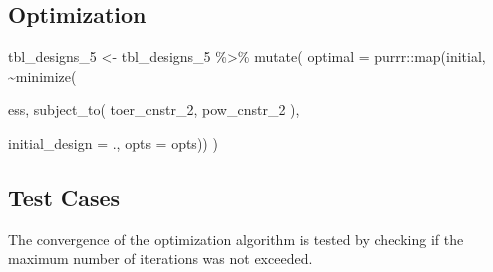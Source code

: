 \documentclass[
]{book}
\newenvironment{Shaded}{\begin{snugshade}}{\end{snugshade}}
\newcommand{\AttributeTok}[1]{\textcolor[rgb]{0.77,0.63,0.00}{#1}}
\newcommand{\FunctionTok}[1]{\textcolor[rgb]{0.00,0.00,0.00}{#1}}
\newcommand{\NormalTok}[1]{#1}
\newcommand{\OtherTok}[1]{\textcolor[rgb]{0.56,0.35,0.01}{#1}}
\newcommand{\SpecialCharTok}[1]{\textcolor[rgb]{0.00,0.00,0.00}{#1}}
\begin{document}
\hypertarget{optimization-8}{%
\subsection{Optimization}\label{optimization-8}}

\begin{Shaded}
\begin{Highlighting}[]
\NormalTok{tbl\_designs\_5 }\OtherTok{\textless{}{-}}\NormalTok{ tbl\_designs\_5 }\SpecialCharTok{\%\textgreater{}\%} 
    \FunctionTok{mutate}\NormalTok{(}
       \AttributeTok{optimal =}\NormalTok{ purrr}\SpecialCharTok{::}\FunctionTok{map}\NormalTok{(initial, }\SpecialCharTok{\textasciitilde{}}\FunctionTok{minimize}\NormalTok{(}
         
\NormalTok{          ess,}
          \FunctionTok{subject\_to}\NormalTok{(}
\NormalTok{              toer\_cnstr\_2,}
\NormalTok{              pow\_cnstr\_2}
\NormalTok{          ),}
          
          \AttributeTok{initial\_design =}\NormalTok{ ., }
          \AttributeTok{opts           =}\NormalTok{ opts)) )}
\end{Highlighting}
\end{Shaded}

\hypertarget{test-cases-9}{%
\subsection{Test Cases}\label{test-cases-9}}

The convergence of the optimization algorithm is tested by checking if the
maximum number of iterations was not exceeded.

\begin{Shaded}
\end{Shaded}
\end{document}

